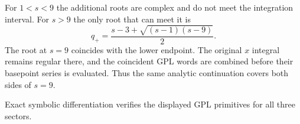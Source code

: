 For $1<s<9$ the additional roots are complex and do not meet the
integration interval. For $s>9$ the only root that can meet it is
\begin{equation}
 q_+=\frac{s-3+\sqrt{(s-1)(s-9)}}{2}.
\end{equation}
The root at $s=9$ coincides with the lower endpoint. The original
$x$ integral remains regular there, and the coincident GPL words
are combined before their basepoint series is evaluated. Thus the
same analytic continuation covers both sides of $s=9$.

Exact symbolic differentiation verifies the displayed GPL
primitives for all three sectors.
